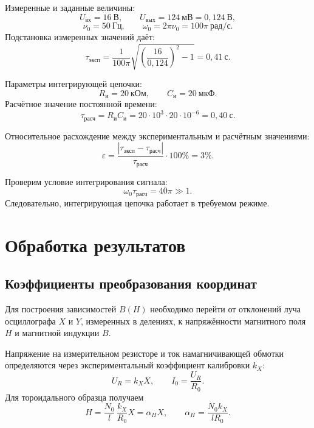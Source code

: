 \documentclass[12pt,a4paper]{article}
\begin{document}
Измеренные и заданные величины:
\[
 U_{\text{вх}}=16\ \text{В},\qquad
 U_{\text{вых}}=124\ \text{мВ}=0{,}124\ \text{В},
\]
\[
 \nu_0=50\ \text{Гц},\qquad
 \omega_0=2\pi\nu_0=100\pi\ \text{рад/с}.
\]
Подстановка измеренных значений даёт:
\[
 \tau_{\text{эксп}}
 =\frac{1}{100\pi}
 \sqrt{\left(\frac{16}{0{,}124}\right)^2-1}
 =0{,}41\ \text{с}.
\]

Параметры интегрирующей цепочки:
\[
 R_{\text{и}}=20\ \text{кОм},\qquad
 C_{\text{и}}=20\ \text{мкФ}.
\]
Расчётное значение постоянной времени:
\begin{equation}
 \tau_{\text{расч}}=R_{\text{и}}C_{\text{и}}
 =20\cdot10^3\cdot20\cdot10^{-6}
 =0{,}40\ \text{с}.
 \label{eq:tau_rc}
\end{equation}

Относительное расхождение между экспериментальным и
расчётным значениями:
\begin{equation}
 \varepsilon=\frac{|\tau_{\text{эксп}}-\tau_{\text{расч}}|}
 {\tau_{\text{расч}}}\cdot100\%=3\%.
 \label{eq:rc_diff}
\end{equation}

Проверим условие интегрирования сигнала:
\[
\omega_0\tau_{\text{расч}}=40\pi\gg1.
\]
Следовательно, интегрирующая цепочка работает в требуемом режиме.

\section{Обработка результатов}

\subsection{Коэффициенты преобразования координат}

Для построения зависимостей $B(H)$ необходимо перейти от отклонений
луча осциллографа $X$ и $Y$, измеренных в делениях, к напряжённости
магнитного поля $H$ и магнитной индукции $B$.

Напряжение на измерительном резисторе и ток намагничивающей обмотки
определяются через экспериментальный коэффициент калибровки $k_X$:
\[
 U_R=k_X X, \qquad I_0=\frac{U_R}{R_0}.
\]
Для тороидального образца получаем
\begin{equation}
 H=\frac{N_0}{l}\,\frac{k_X}{R_0}X=\alpha_H X,
 \qquad \alpha_H=\frac{N_0 k_X}{lR_0}.
 \label{eq:alphaH}
\end{equation}
\end{document}
